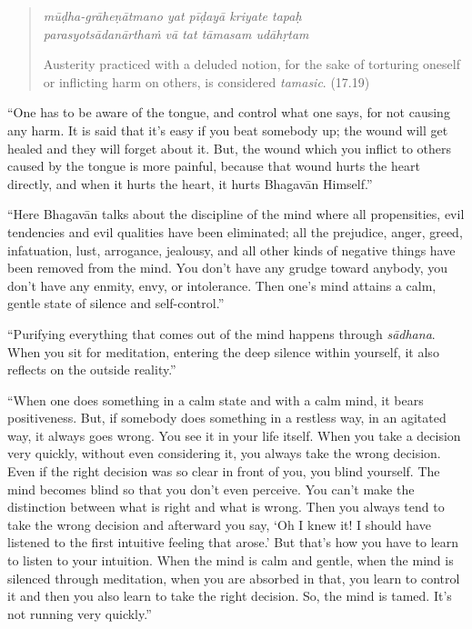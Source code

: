 \documentclass[12pt, twoside, openright]{memoir}
\begin{document}
\par
\begin{verse}
\textit{mūḍha-grāheṇātmano yat pīḍayā kriyate tapaḥ} \\
\textit{parasyotsādanārthaṁ vā tat tāmasam udāhṛtam}

\noindent Austerity practiced with a deluded notion, for the sake of torturing oneself or inflicting harm on others, is considered \textit{tamasic}. (17.19)
\end{verse}
\par


\enquote{One has to be aware of the tongue, and control what one says, for not causing any harm. It is said that it’s easy if you beat somebody up; the wound will get healed and they will forget about it. But, the wound which you inflict to others caused by the tongue is more painful, because that wound hurts the heart directly, and when it hurts the heart, it hurts Bhagavān Himself.}

\enquote{Here Bhagavān talks about the discipline of the mind where all propensities, evil tendencies and evil qualities have been eliminated; all the prejudice, anger, greed, infatuation, lust, arrogance, jealousy, and all other kinds of negative things have been removed from the mind. You don’t have any grudge toward anybody, you don’t have any enmity, envy, or intolerance. Then one’s mind attains a calm, gentle state of silence and self-control.}

\enquote{Purifying everything that comes out of the mind happens through \textit{sādhana}. When you sit for meditation, entering the deep silence within yourself, it also reflects on the outside reality.}

\enquote{When one does something in a calm state and with a calm mind, it bears positiveness. But, if somebody does something in a restless way, in an agitated way, it always goes wrong. You see it in your life itself. When you take a decision very quickly, without even considering it, you always take the wrong decision. Even if the right decision was so clear in front of you, you blind yourself. The mind becomes blind so that you don’t even perceive. You can’t make the distinction between what is right and what is wrong. Then you always tend to take the wrong decision and afterward you say, \enquote{Oh I knew it! I should have listened to the first intuitive feeling that arose.} But that’s how you have to learn to listen to your intuition. When the mind is calm and gentle, when the mind is silenced through meditation, when you are absorbed in that, you learn to control it and then you also learn to take the right decision. So, the mind is tamed. It’s not running very quickly.}
\end{document}
